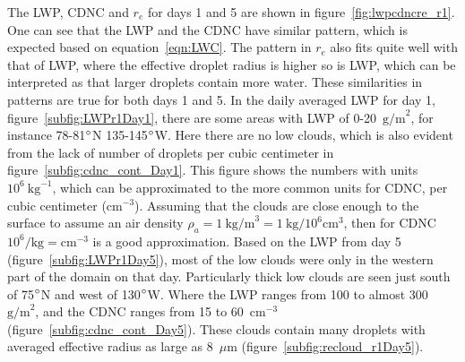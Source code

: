 The LWP, CDNC and $r_e$ for days 1 and 5 are shown in figure~\ref{fig:lwpcdncre_r1}. One can see that the LWP and the CDNC have similar pattern, which is expected based on equation~\ref{eqn:LWC}. The pattern in $r_e$ also fits quite well with that of LWP, where the effective droplet radius is higher so is LWP, which can be interpreted as that larger droplets contain more water. These similarities in patterns are true for both days 1 and 5. In the daily averaged LWP for day 1, figure~\ref{subfig:LWPr1Day1}, there are some areas with LWP of 0-20~$\text{g/m}^2$, for instance 78-81$\degree$N 135-145$\degree$W. Here there are no low clouds, which is also evident from the lack of number of droplets per cubic centimeter in figure~\ref{subfig:cdnc_cont_Day1}. This figure shows the numbers with units $10^6~\text{kg}^{-1}$, which can be approximated to the more common units for CDNC, per cubic centimeter ($\text{cm}^{-3}$). Assuming that the clouds are close enough to the surface to assume an air density $\rho_a = 1~\text{kg/m}^3=1~\text{kg/}10^6\text{cm}^3$, then for CDNC $10^6/\text{kg} = \text{cm}^{-3}$ is a good approximation.
Based on the LWP from day 5 (figure~\ref{subfig:LWPr1Day5}), most of the low clouds were only in the western part of the domain on that day. Particularly thick low clouds are seen just south of 75$\degree$N and west of 130$\degree$W. Where the LWP ranges from 100 to almost 300~$\text{g/m}^2$, and the CDNC ranges from 15 to 60~$\text{cm}^{-3}$ (figure~\ref{subfig:cdnc_cont_Day5}). These clouds contain many droplets with averaged effective radius as large as 8~$\mu\text{m}$ (figure~\ref{subfig:recloud_r1Day5}).

